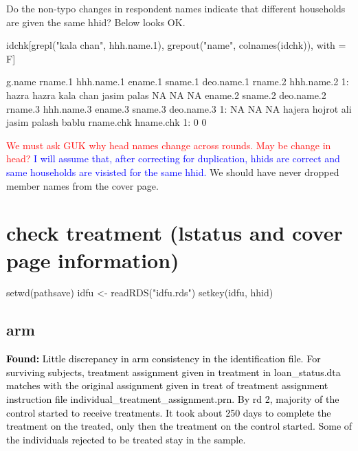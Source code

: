 Do the non-typo changes in respondent names indicate that different households are given the same \textsf{hhid}? Below looks OK.
\begin{Schunk}
\begin{Sinput}
idchk[grepl("kala chan", hhh.name.1), 
	grepout("name", colnames(idchk)), with = F]
\end{Sinput}
\begin{Soutput}
   g.name rname.1 hhh.name.1 ename.1 sname.1 deo.name.1 rname.2 hhh.name.2
1:  hazra   hazra  kala chan   jasim   palas         NA      NA         NA
   ename.2 sname.2 deo.name.2 rname.3 hhh.name.3 ename.3 sname.3 deo.name.3
1:      NA      NA         NA  hajera hojrot ali   jasim  palash      bablu
   rname.chk hname.chk
1:         0         0
\end{Soutput}
\end{Schunk}
\textcolor{red}{We must ask GUK why head names change across rounds. May be change in head?} \textcolor{blue}{I will assume that, after correcting for duplication, \textsf{hhid}s are correct and same households are visisted for the same \textsf{hhid}.} We should have never dropped member names from the cover page.


\section{check treatment (lstatus and cover page information)}


\begin{Schunk}
\begin{Sinput}
setwd(pathsave)
idfu <- readRDS("idfu.rds")
setkey(idfu, hhid)
\end{Sinput}
\end{Schunk}

\subsection{arm}


\textcolor{black}{\textbf{Found:} Little discrepancy in arm consistency in the identification file. For surviving subjects, treatment assignment given in \textsf{treatment} in loan\_status.dta matches with the original assignment given in \textsf{treat} of treatment assignment instruction file \textsf{\footnotesize individual\_treatment\_assignment.prn}. By rd 2, majority of the control started to receive treatments. It took about 250 days to complete the treatment on the treated, only then the treatment on the control started. %
Some of the individuals rejected to be treated stay in the sample.}

